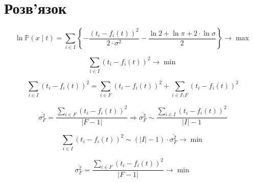 \section{Розв'язок}

\begin{equation*}
  \ln{\mathbb{P}\left( x \mid t \right)}
  = \sum_{i \in I}
    \left\{
      - \frac{\left( t_i - f_i\left( t \right) \right)^2}{2 \cdot \sigma^2}
      - \frac{\ln{2} + \ln{\pi} + 2 \cdot \ln{\sigma}}{2}
    \right\}
  \to \max
\end{equation*}

\begin{equation*}
  \sum_{i \in I} \left( t_i - f_i\left( t \right) \right)^2 \to \min
\end{equation*}

\begin{equation*}
  \sum_{i \in I} \left( t_i - f_i\left( t \right) \right)^2
  = \sum_{i \in F} \left( t_i - f_i\left( t \right) \right)^2
  + \sum_{i \in I \setminus F} \left( t_i - f_i\left( t \right) \right)^2
\end{equation*}

\begin{equation*}
    \overline{\sigma_F^2}
    = \frac{\sum\limits_{i \in F} \left( t_i - f_i\left( t \right) \right)^2}
           {\left| F - 1 \right|}
    \Rightarrow
    \overline{\sigma_F^2}
    \sim \frac{\sum\limits_{i \in I}
                 \left( t_i - f_i\left( t \right) \right)^2}
               {\left| I \right| - 1}
\end{equation*}

\begin{equation*}
  \sum_{i \in I} \left( t_i - f_i\left( t \right) \right)^2
  \sim \left( \left| I \right| - 1 \right) \cdot \overline{\sigma_F^2}
  \to \min
\end{equation*}

\begin{equation*}
  \overline{\sigma_F^2}
  = \frac{\sum\limits_{i \in F} \left( t_i - f_i\left( t \right) \right)^2}
         {\left| F - 1 \right|}
  \to \min
\end{equation*}
